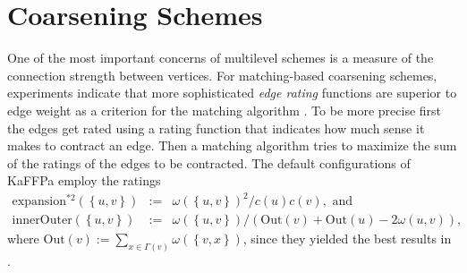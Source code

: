 \documentclass{llncs}
\newcommand{\set}[1]{\left\{ #1\right\}}
\newcommand{\Is}       {:=}
\newcommand{\innerOuter}{\mathrm{innerOuter}}
\newcommand{\expansion}{\mathrm{expansion}}
\newcommand{\Outer}{\mathrm{Out}}
\begin{document}
\section{Coarsening Schemes}
\label{sec:coarsening}

\par One of the most important concerns of multilevel schemes is a measure of the connection strength between vertices. 
For matching-based coarsening schemes, experiments indicate that more sophisticated \textit{edge rating} functions are superior to edge weight as a criterion for the matching algorithm \cite{kappa}. 
To be more precise first the edges get rated using a rating function that indicates how much sense it makes to contract an edge. Then a matching algorithm tries to maximize the sum of the ratings of the edges to be contracted. 
The default configurations of KaFFPa employ the ratings 
\begin{eqnarray*}
\expansion^{*2}(\set{u,v}) & \Is &  {\omega(\set{u,v})^2}/{c(u)c(v)}, \text{ and}\\
\innerOuter(\set{u,v}) & \Is & {\omega(\set{u,v})}/{(\Outer(v)+\Outer(u)-2\omega({u,v}))},
\end{eqnarray*}
where $\Outer(v)\Is \sum_{x\in\Gamma(v)}\omega(\set{v,x})$, since they yielded the best results in \cite{kappa}. 
\end{document}
